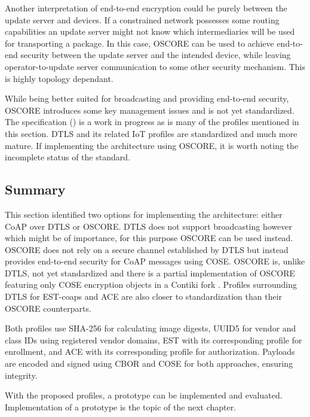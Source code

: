 \documentclass[0-thesis.tex]{subfiles}
\begin{document}
Another interpretation of end-to-end encryption could be purely between the update server
and devices. If a constrained network possesses some routing capabilities an update server
might not know which intermediaries will be used for transporting a package. In this case,
OSCORE can be used to achieve end-to-end security between the update server and the
intended device, while leaving operator-to-update server communication to some other
security mechanism. This is highly topology dependant.

While being better suited for broadcasting and providing end-to-end security, OSCORE
introduces some key management issues and is not yet standardized. The specification
(\parencite{oscore}) is a work in progress as is many of the profiles mentioned in this
section. DTLS and its related IoT profiles are standardized and much more mature. If
implementing the architecture using OSCORE, it is worth noting the incomplete status of
the standard.

\subsection{Summary}
\label{ssec:profiles-summary}
This section identified two options for implementing the architecture: either CoAP over
DTLS or OSCORE. DTLS does not support broadcasting however which might be of importance,
for this purpose OSCORE can be used instead. OSCORE does not rely on a secure channel
established by DTLS but instead provides end-to-end security for CoAP messages using COSE.
OSCORE is, unlike DTLS, not yet standardized and there is a partial implementation of
OSCORE featuring only COSE encryption objects in a Contiki fork
\parencite{contiki-oscore}. Profiles surrounding DTLS for EST-coaps and ACE are also
closer to standardization than their OSCORE counterparts.

Both profiles use SHA-256 for calculating image digests, UUID5 for vendor and class IDs
using registered vendor domains, EST with its corresponding profile for enrollment, and
ACE with its corresponding profile for authorization. Payloads are encoded and signed
using CBOR and COSE for both approaches, ensuring integrity.

With the proposed profiles, a prototype can be implemented and evaluated. Implementation
of a prototype is the topic of the next chapter.
\end{document}
